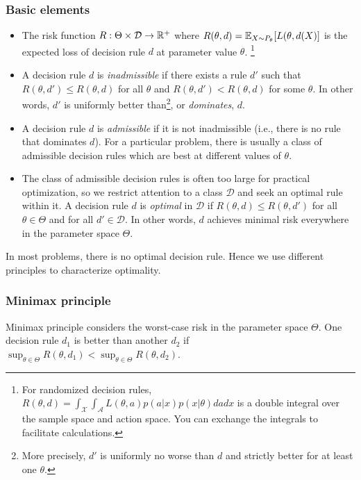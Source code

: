 \subsubsection{Basic elements}
\begin{itemize}
    \item The risk function $R:\Theta \times \mathcal{D} \to \mathbb{R}^+$ where $R(\theta,d) = \mathbb{E}_{X \sim P_\theta}[L(\theta, d(X)]$ is the expected loss of decision rule $d$ at parameter value $\theta$. \footnote{For randomized decision rules, $R(\theta,d) = \int_\mathcal{X}\int_\mathcal{A} L(\theta,a)p(a|x)p(x|\theta) dadx$ is a double integral over the sample space and action space. You can exchange the integrals to facilitate calculations.}
    \item A decision rule $d$ is \emph{inadmissible} if there exists a rule $d'$ such that $R(\theta, d') \leq R(\theta, d)$ for all $\theta$ and $R(\theta, d') < R(\theta, d)$ for some $\theta$. In other words, $d'$ is uniformly better than\footnote{More precisely, $d'$ is uniformly no worse than $d$ and strictly better for at least one $\theta$.}, or \emph{dominates}, $d$.
    \item A decision rule $d$ is \emph{admissible} if it is not inadmissible (i.e., there is no rule that dominates $d$). For a particular problem, there is usually a class of admissible decision rules which are best at different values of $\theta$.
    \item The class of admissible decision rules is often too large for practical optimization, so we restrict attention to a class $\mathcal{D}$ and seek an optimal rule within it. A decision rule $d$ is \emph{optimal} in $\mathcal{D}$ if $R(\theta, d) \leq R(\theta, d')$ for all $\theta \in \Theta$ and for all $d' \in \mathcal{D}$. In other words, $d$ achieves minimal risk everywhere in the parameter space $\Theta$.
\end{itemize}

In most problems, there is no optimal decision rule. Hence we use different principles to characterize optimality.

\subsubsection{Minimax principle} %
Minimax principle considers the worst-case risk in the parameter space $\Theta$. One decision rule $d_1$ is better than another $d_2$ if $\sup_{\theta\in \Theta} R(\theta,d_1) < \sup_{\theta\in \Theta} R(\theta,d_2)$.

